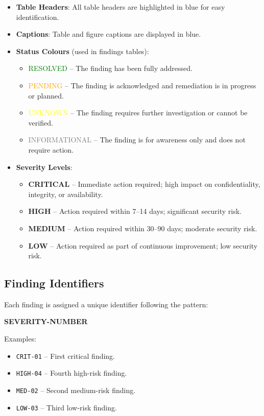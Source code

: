 \begin{itemize}
    \item \textbf{Table Headers}: All table headers are highlighted in \textcolor{mooveblue}{blue} for easy identification.
    \item \textbf{Captions}: Table and figure captions are displayed in \textcolor{mooveblue}{blue}.
    \item \textbf{Status Colours} (used in findings tables):
    \begin{itemize}
        \item \textcolor{green}{RESOLVED} – The finding has been fully addressed.
        \item \textcolor{orange}{PENDING} – The finding is acknowledged and remediation is in progress or planned.
        \item \textcolor{yellow}{UNKNOWN} – The finding requires further investigation or cannot be verified.
        \item \textcolor{gray}{INFORMATIONAL} – The finding is for awareness only and does not require action.
    \end{itemize}
    \item \textbf{Severity Levels}:
    \begin{itemize}
        \item \textbf{CRITICAL} – Immediate action required; high impact on confidentiality, integrity, or availability.
        \item \textbf{HIGH} – Action required within 7–14 days; significant security risk.
        \item \textbf{MEDIUM} – Action required within 30–90 days; moderate security risk.
        \item \textbf{LOW} – Action required as part of continuous improvement; low security risk.
    \end{itemize}
\end{itemize}

\subsection*{Finding Identifiers}

Each finding is assigned a unique identifier following the pattern:

\begin{center}
\textbf{SEVERITY-NUMBER}
\end{center}

Examples:
\begin{itemize}
    \item \texttt{CRIT-01} – First critical finding.
    \item \texttt{HIGH-04} – Fourth high-risk finding.
    \item \texttt{MED-02} – Second medium-risk finding.
    \item \texttt{LOW-03} – Third low-risk finding.
\end{itemize}

